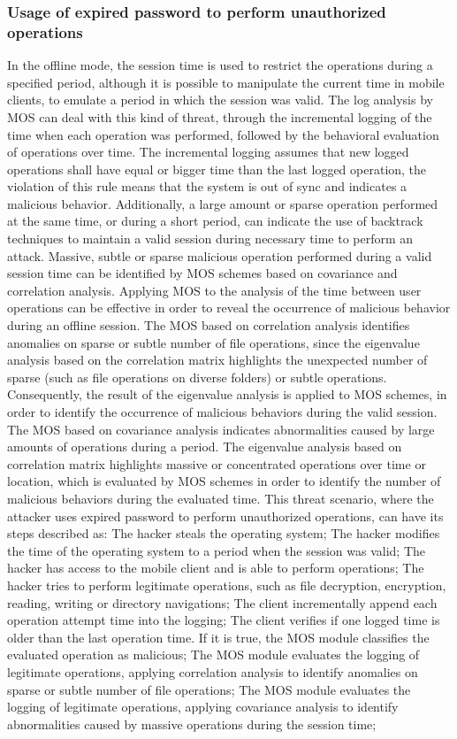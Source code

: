 \documentclass[twocolumn]{svjour3}          %
\begin{document}
\subsubsection{Usage of expired password to perform unauthorized operations }
\label{sec_attacker_expired}
In the offline mode, the session time is used to restrict the operations during a specified period, although it is possible to manipulate the current time in mobile clients, to emulate a period in which the session was valid. The log analysis by MOS can deal with this kind of threat, through the incremental logging of the time when each operation was performed, followed by the behavioral evaluation of operations over time. 
The incremental logging assumes that new logged operations shall have equal or bigger time than the last logged operation, the violation of this rule means that the system is out of sync and indicates a malicious behavior. Additionally, a large amount or sparse operation performed at the same time, or during a short period, can indicate the use of backtrack techniques to maintain a valid session during necessary time to perform an attack. Massive, subtle or sparse malicious operation performed during a valid session time can be identified by MOS schemes based on covariance and correlation analysis.
Applying MOS to the analysis of the time between user operations can be effective in order to reveal the occurrence of malicious behavior during an offline session. The MOS based on correlation analysis identifies anomalies on sparse or subtle number of file operations, since the eigenvalue analysis based on the correlation matrix highlights the unexpected number of sparse (such as file operations on diverse folders) or subtle operations. Consequently, the result of the eigenvalue analysis is applied to MOS schemes, in order to identify the occurrence of malicious behaviors during the valid session.
The MOS based on covariance analysis indicates abnormalities caused by large amounts of operations during a period. The eigenvalue analysis based on correlation matrix highlights massive or concentrated operations over time or location, which is evaluated by MOS schemes in order to identify the number of malicious behaviors during the evaluated time.
This threat scenario, where the attacker uses expired password to perform unauthorized operations, can have its steps described as:
The hacker steals the operating system;
The hacker modifies the time of the operating system to a period when the session was valid;
The hacker has access to the mobile client and is able to perform operations;
The hacker tries to perform legitimate operations, such as file decryption, encryption, reading, writing or directory navigations;
The client incrementally append each operation attempt time into the logging;
The client verifies if one logged time is older than the last operation time. If it is true, the MOS module classifies the evaluated operation as malicious;
The MOS module evaluates the logging of legitimate operations, applying correlation analysis to identify anomalies on sparse or subtle number of file operations;
The MOS module evaluates the logging of legitimate operations, applying covariance analysis to identify abnormalities caused by massive operations during the session time;
\end{document}
